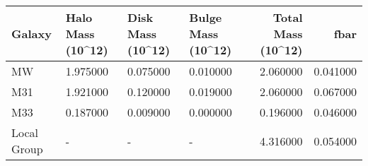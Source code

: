 \begin{tabular}{llllrr}
\toprule
Galaxy & Halo Mass (10^12) & Disk Mass (10^12) & Bulge Mass (10^12) & Total Mass (10^12) & fbar \\
\midrule
MW & 1.975000 & 0.075000 & 0.010000 & 2.060000 & 0.041000 \\
M31 & 1.921000 & 0.120000 & 0.019000 & 2.060000 & 0.067000 \\
M33 & 0.187000 & 0.009000 & 0.000000 & 0.196000 & 0.046000 \\
Local Group & - & - & - & 4.316000 & 0.054000 \\
\bottomrule
\end{tabular}
